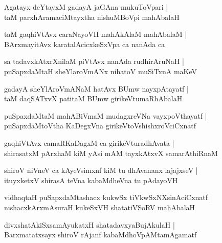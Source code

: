 \documentclass[twoside,12pt,openright]{book}
\newcounter{shloka}[chapter]
\begin{document}
\begin{shloka}%
Agatayx deYtayxM gadayA jaGAna mukuToVpari |\\
taM parxhAramaciMtayxtha nishuMBoVpi mahAbalaH 
\end{shloka}

\begin{shloka}%
taM gaqhiVtAvx caraNayoVH mahAkAlaM mahAbalaM |\\
BArxmayitAvx karatalAcicxkeSxVpa ca nanAda ca 
\end{shloka}

\begin{shloka}%
sa tadavxkAtxrXnilaM piVtAvx nanAda rudhirAruNaH |\\
puSapxdaMtaH sheYlaroVmANx nihatoV muSiTxnA maKeV 
\end{shloka}

\begin{shloka}%
gadayA sheYlAroVmANaM hatAvx BUmw nayxpAtayatf |\\
taM daqSATxvX  patitaM BUmw girikeVtumaRhAbalaH 
\end{shloka}

\begin{center}%
puSpaxdaMtaM mahABiVmaM mudagxreVNa vayxpoVthayatf |\\
puSapxdaMtoVtha KaDegxVna girikeVtoVshishxroVciCxnatf
\end{center}

\begin{shloka}%
gaqhiVtAvx camaRKaDagxM ca girikeVturadhAvata |\\
shirasatxM pArxhaM kiM  yAsi mAM tayxkAtxvX samarAthiRnaM 
\end{shloka}

\begin{shloka}%
shiroV niVneV ca kAyeVsimxnf kiM tu dhAvananx lajajxseV |\\
ituyxketxV shirasA teVna kabaMdheVna tu pAdayoVH 
\end{shloka}

\begin{shloka}%
vidhaqtaH puSapxdaMtashacx kukwSx tiVkwSxNXsinAciCxnatf |\\
nishacxkArxmAsuraH kukeSxVH shatatiVSoRV mahAbalaH 
\end{shloka}

\begin{shloka}%
divxshatAkiSxsamAyukatxH shatadavxyaBujAkulaH |\\
Barxmatatxsayx shiroV rAjanf kabaMdhoVpAMtamAgamatf 
\end{shloka}
\end{document}
